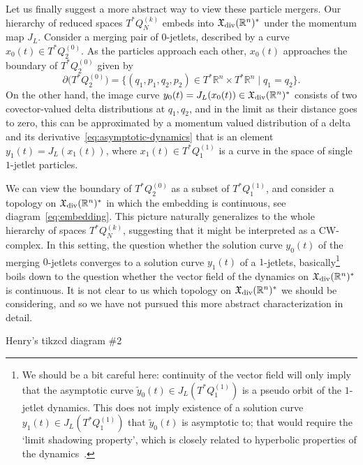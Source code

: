 \documentclass[12pt]{amsart}
\newcommand{\R}{\ensuremath{\mathbb{R}}}
\begin{document}
Let us finally suggest a more abstract way to view these particle
mergers. Our hierarchy of reduced spaces $T^*Q_N^{(k)}$ embeds into
$\mathfrak{X}_{\rm div}(\R^n)^*$ under the momentum map $J_L$.
Consider a merging pair of $0$-jetlets, described by a curve
$x_0(t) \in T^*Q_2^{(0)}$. As the particles approach each other,
$x_0(t)$ approaches the boundary of $T^*Q_2^{(0)}$ given by
\begin{equation}\label{eq:boundary}
  \partial\big( T^*Q_2^{(0)} \big)
  = \{ (q_1,p_1,q_2,p_2) \in T^* \R^n \times T^* \R^n \mid q_1 = q_2 \}.
\end{equation}
On the other hand, the image curve
$y_0(t) = J_L(x_0(t)) \in \mathfrak{X}_{\rm div}(\R^n)^*$ consists of
two covector-valued delta distributions at $q_1,q_2$, and in the limit
as their distance goes to zero, this can be approximated by a momentum
valued distribution of a delta and its
derivative~\eqref{eq:asymptotic-dynamics} that is an element
$y_1(t) = J_L(x_1(t))$, where $x_1(t) \in T^*Q_1^{(1)}$ is a curve in
the space of single $1$-jetlet particles.

We can view the boundary of $T^*Q_2^{(0)}$ as a subset of $T^*Q_1^{(1)}$,
and consider a topology on $\mathfrak{X}_{\rm div}(\mathbb{R}^n)^*$ in which
the embedding is continuous,
see diagram~\eqref{eq:embedding}.
This picture naturally generalizes to the whole hierarchy of spaces
$T^*Q_N^{(k)}$, suggesting that it might be interpreted as a
CW-complex. In this setting, the question whether the solution curve
$y_0(t)$ of the merging $0$-jetlets converges to a solution curve
$y_1(t)$ of a $1$-jetlets, basically\footnote{%
  We should be a bit careful here: continuity of the vector field will
  only imply that the asymptotic curve $\tilde{y}_0(t) \in J_L(T^*Q_1^{(1)})$
  is a pseudo orbit of the $1$-jetlet dynamics. This does not imply
  existence of a solution curve $y_1(t) \in J_L(T^*Q_1^{(1)})$ that
  $\tilde{y}_0(t)$ is asymptotic to; that would require the `limit
  shadowing property', which is closely related to hyperbolic
  properties of the dynamics~\cite{Ribeiro2014}.%
} boils down to the question whether the vector field of the dynamics
on $\mathfrak{X}_{\rm div}(\R^n)^*$ is continuous.
It is not clear to us which topology on $\mathfrak{X}_{\rm div}(\R^n)^*$ we should
be considering, and so we have not pursued
this more abstract characterization in detail.

 \begin{framed} Henry's tikzcd diagram \#2
 \end{framed}
 
\end{document}
